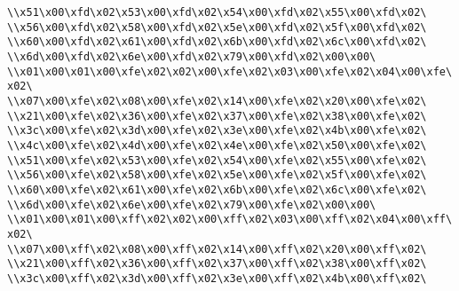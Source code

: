 \verb|\\x51\x00\xfd\x02\x53\x00\xfd\x02\x54\x00\xfd\x02\x55\x00\xfd\x02\|\newline
\verb|\\x56\x00\xfd\x02\x58\x00\xfd\x02\x5e\x00\xfd\x02\x5f\x00\xfd\x02\|\newline
\verb|\\x60\x00\xfd\x02\x61\x00\xfd\x02\x6b\x00\xfd\x02\x6c\x00\xfd\x02\|\newline
\verb|\\x6d\x00\xfd\x02\x6e\x00\xfd\x02\x79\x00\xfd\x02\x00\x00\|\newline
\verb|\\x01\x00\x01\x00\xfe\x02\x02\x00\xfe\x02\x03\x00\xfe\x02\x04\x00\xfe\x02\|\newline
\verb|\\x07\x00\xfe\x02\x08\x00\xfe\x02\x14\x00\xfe\x02\x20\x00\xfe\x02\|\newline
\verb|\\x21\x00\xfe\x02\x36\x00\xfe\x02\x37\x00\xfe\x02\x38\x00\xfe\x02\|\newline
\verb|\\x3c\x00\xfe\x02\x3d\x00\xfe\x02\x3e\x00\xfe\x02\x4b\x00\xfe\x02\|\newline
\verb|\\x4c\x00\xfe\x02\x4d\x00\xfe\x02\x4e\x00\xfe\x02\x50\x00\xfe\x02\|\newline
\verb|\\x51\x00\xfe\x02\x53\x00\xfe\x02\x54\x00\xfe\x02\x55\x00\xfe\x02\|\newline
\verb|\\x56\x00\xfe\x02\x58\x00\xfe\x02\x5e\x00\xfe\x02\x5f\x00\xfe\x02\|\newline
\verb|\\x60\x00\xfe\x02\x61\x00\xfe\x02\x6b\x00\xfe\x02\x6c\x00\xfe\x02\|\newline
\verb|\\x6d\x00\xfe\x02\x6e\x00\xfe\x02\x79\x00\xfe\x02\x00\x00\|\newline
\verb|\\x01\x00\x01\x00\xff\x02\x02\x00\xff\x02\x03\x00\xff\x02\x04\x00\xff\x02\|\newline
\verb|\\x07\x00\xff\x02\x08\x00\xff\x02\x14\x00\xff\x02\x20\x00\xff\x02\|\newline
\verb|\\x21\x00\xff\x02\x36\x00\xff\x02\x37\x00\xff\x02\x38\x00\xff\x02\|\newline
\verb|\\x3c\x00\xff\x02\x3d\x00\xff\x02\x3e\x00\xff\x02\x4b\x00\xff\x02\|\newline
